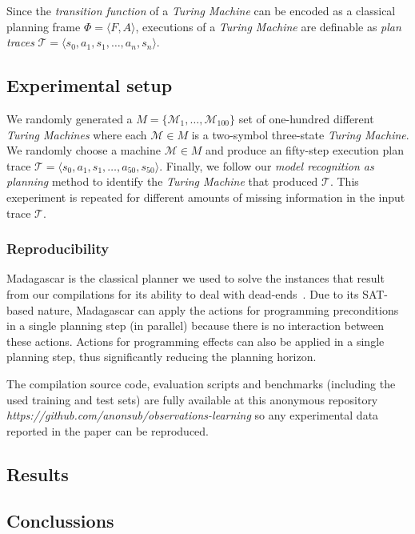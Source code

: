 \documentclass[letterpaper]{article} %
\newcommand{\tup}[1]{{\langle #1 \rangle}}
\begin{document}
Since the {\em transition function} of a {\em Turing Machine} can be encoded as a classical planning frame $\Phi=\tup{F,A}$, executions of a {\em Turing Machine} are definable as {\em plan traces} $\mathcal{T}=\tup{s_0,a_1,s_1,\ldots,a_n,s_n}$. 

\subsection{Experimental setup}
We randomly generated a $M=\{\mathcal{M}_1,\ldots,\mathcal{M}_{100}\}$ set of one-hundred different {\em Turing Machines} where each $\mathcal{M}\in M$ is a two-symbol three-state {\em Turing Machine}. We randomly choose a machine $\mathcal{M}\in M$ and produce an fifty-step execution plan trace $\mathcal{T}=\tup{s_0,a_1,s_1,\ldots,a_{50},s_{50}}$. Finally, we follow our {\em model recognition as planning} method to identify the {\em Turing Machine} that produced $\mathcal{T}$. This exeperiment is repeated for different amounts of missing information in the input trace $\mathcal{T}$.

\subsubsection{Reproducibility}
{\sc Madagascar} is the classical planner we used to solve the instances that result from our compilations for its ability to deal with dead-ends~\cite{rintanen2014madagascar}. Due to its SAT-based nature, {\sc Madagascar} can apply the actions for programming preconditions in a single planning step (in parallel) because there is no interaction between these actions. Actions for programming effects can also be applied in a single planning step, thus significantly reducing the planning horizon.

The compilation source code, evaluation scripts and benchmarks (including the used training and test sets) are fully available at this anonymous repository {\em https://github.com/anonsub/observations-learning} so any experimental data reported in the paper can be reproduced.

\subsection{Results}

\subsection{Conclussions}
\label{sec:conclussions}
\end{document}
